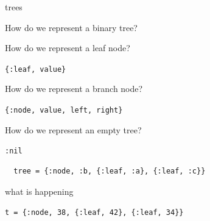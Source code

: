 \begin{frame}[fragile]{trees}

\pause How do we represent a binary tree?


\vspace{10pt}
\pause How do we represent a leaf node?

\vspace{10pt}
{\tt \{:leaf, value\}}

\vspace{20pt}
\pause How do we represent a branch node?

\vspace{10pt}
{\tt \{:node, value, left, right\}}

\vspace{10pt}
\pause How do we represent an empty tree?

\vspace{10pt}
{\tt :nil}


\vspace{10pt}

\begin{verbatim}
  tree = {:node, :b, {:leaf, :a}, {:leaf, :c}}
\end{verbatim}


\end{frame}


\begin{frame}{what is happening}

{\tt t = \{:node, 38, \{:leaf, 42\}, \{:leaf, 34\}\}}

\pause \vspace{20pt}


\end{frame}

